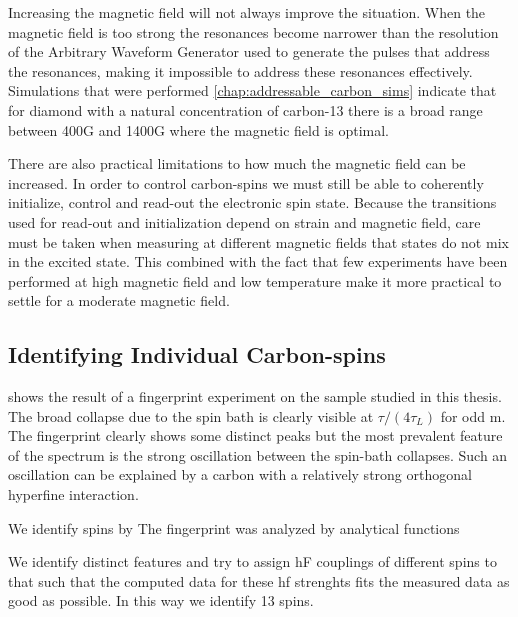 Increasing the magnetic field will not always improve the situation. When the magnetic field is too strong the resonances become narrower than the resolution of the Arbitrary Waveform Generator used to generate the pulses that address the resonances, making it impossible to address these resonances effectively.
Simulations that were performed \cref{chap:addressable_carbon_sims} indicate that for diamond with a natural concentration of carbon-13 there is a broad range between 400G and 1400G where the magnetic field is optimal.

There are also practical limitations to how much the magnetic field can be increased. In order to control carbon-spins we must still be able to coherently initialize, control and read-out the electronic spin state. Because the transitions used for read-out and initialization depend on strain and magnetic field\citep{Hensen2011MeasurementBased}, care must be taken when measuring at different magnetic fields that states do not mix in the excited state.
This combined with the fact that few experiments have been performed at high magnetic field and low temperature make it more practical to settle for a moderate magnetic field.


\subsection*{Identifying Individual Carbon-spins}
 shows the result of a fingerprint experiment on the sample studied in this thesis.
The broad collapse due to the spin bath is clearly visible at $\tau/(4 \tau _L)$ for odd m.
The fingerprint clearly shows some distinct peaks but the most prevalent feature of the spectrum is the strong oscillation between the spin-bath collapses. Such an oscillation can be explained by a carbon with a relatively strong orthogonal hyperfine interaction.

We identify spins by
The fingerprint was analyzed by
analytical functions

We identify distinct features and try to assign hF couplings of different spins to that such that the computed data for these hf strenghts fits the measured data as good as possible.
In this way we identify 13 spins.




